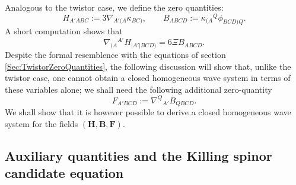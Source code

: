 \documentclass[10pt,a4paper]{article}
\theoremstyle{plain}
\def\bmB{{\bm B}}
\def\bmF{{\bm F}}
\def\bmH{{\bm H}}
\begin{document}
Analogous to the twistor case, we define the zero quantities:
\begin{equation}\label{KS_zero_quantities1}
H_{A'ABC}:=3\nabla_{A'(A}\kappa_{BC)}, \qquad
B_{ABCD}:=\kappa_{(A}{}^Q\phi_{BCD)Q}.
\end{equation}
A short computation shows that
\begin{equation}
\nabla_{(A}{}^{A'}H_{\vert A'\vert BCD)} = 6\Xi
B_{ABCD}. \label{Eq:BuchdahlAsCurlOfH}
\end{equation}
Despite the formal resemblence with the equations of section
\ref{Sec:TwistorZeroQuantities}, the following discussion will show
that, unlike the twistor case, one cannot obtain a closed homogeneous
wave system in terms of these variables alone; we shall need the
following additional zero-quantity
\begin{equation}
 F_{A'BCD}:=\nabla^Q{}_{A'}B_{QBCD}.\label{Eq:DefZeroQuantityF}
\end{equation}
We shall show that it is however possible to derive a closed
homogeneous wave system for the fields $(\bmH, \bmB, \bmF)$.


\subsection{Auxiliary quantities and the Killing spinor candidate equation}
\end{document}

